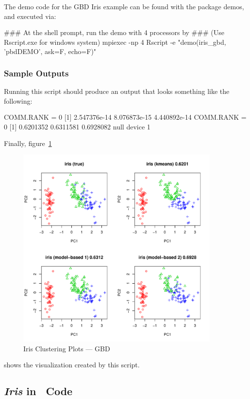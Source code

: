 The demo code for the GBD Iris example can be found with the package
demos, and executed via:
\begin{Command}
### At the shell prompt, run the demo with 4 processors by
### (Use Rscript.exe for windows system)
mpiexec -np 4 Rscript -e "demo(iris_gbd, 'pbdDEMO', ask=F, echo=F)"
\end{Command}

\subsubsection{Sample Outputs}
Running this script should produce an output that looks something like the following:
\begin{Output}
COMM.RANK = 0
[1] 2.547376e-14 8.076873e-15 4.440892e-14
COMM.RANK = 0
[1] 0.6201352 0.6311581 0.6928082
null device 
          1 
\end{Output}

Finally, figure~\ref{fig:iris_cluster_gbd}
\begin{figure}[h!bt]
  \centering
  \includegraphics[width=4in]{pbdDEMO-include/pics/gbd_plot.pdf}
  \caption{Iris Clustering Plots --- GBD}
  \label{fig:iris_cluster_gbd}
\end{figure}
shows the visualization created by this script.




\subsection{{\it Iris} in \ Code}

